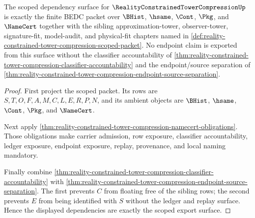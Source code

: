 \begin{theorem}
\label{thm:reality-constrained-tower-compression-scoped-dependency-surface}
The scoped dependency surface for $\RealityConstrainedTowerCompressionUp$ is exactly the finite BEDC packet over $\BHist$, $\hsame$, $\Cont$, $\Pkg$, and $\NameCert$ together with the sibling approximation-tower, observer-tower, signature-fit, model-audit, and physical-fit chapters named in \autoref{def:reality-constrained-tower-compression-scoped-packet}. No endpoint claim is exported from this surface without the classifier accountability of \autoref{thm:reality-constrained-tower-compression-classifier-accountability} and the endpoint/source separation of \autoref{thm:reality-constrained-tower-compression-endpoint-source-separation}.
\end{theorem}
\begin{proof}
First project the scoped packet. Its rows are $S,T,O,F,A,M,C,L,E,R,P,N$, and its ambient objects are $\BHist$, $\hsame$, $\Cont$, $\Pkg$, and $\NameCert$.

Next apply \autoref{thm:reality-constrained-tower-compression-namecert-obligations}. Those obligations make carrier admission, row exposure, classifier accountability, ledger exposure, endpoint exposure, replay, provenance, and local naming mandatory.

Finally combine \autoref{thm:reality-constrained-tower-compression-classifier-accountability} with \autoref{thm:reality-constrained-tower-compression-endpoint-source-separation}. The first prevents $C$ from floating free of the sibling rows; the second prevents $E$ from being identified with $S$ without the ledger and replay surface. Hence the displayed dependencies are exactly the scoped export surface.
\end{proof}

